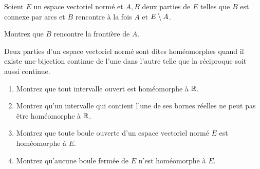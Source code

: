 \begin{corr}
\end{corr}

\begin{exoss}[Exercice 29]
Soient \(E\) un espace vectoriel normé et \(A,B\) deux parties de \(E\) telles que \(B\) est connexe par arcs et \(B\) rencontre à la fois \(A\) et \(E\setminus A\).

Montrez que \(B\) rencontre la frontière de \(A\).
\end{exoss}

\begin{corr}
\end{corr}

\begin{exoss}[Exercice 30]
Deux parties d'un espace vectoriel normé sont dites homéomorphes quand il existe une bijection continue de l'une dans l'autre telle que la réciproque soit aussi continue.

\begin{enumerate}
    \item Montrez que tout intervalle ouvert est homéomorphe à \(\mathbb{R}\). \\
    \item Montrez qu'un intervalle qui contient l'une de ses bornes réelles ne peut pas être homéomorphe à \(\mathbb{R}\). \\
    \item Montrez que toute boule ouverte d'un espace vectoriel normé \(E\) est homéomorphe à \(E\). \\
    \item Montrez qu'aucune boule fermée de \(E\) n'est homéomorphe à \(E\).
\end{enumerate}
\end{exoss}

\begin{corr}
\end{corr}

